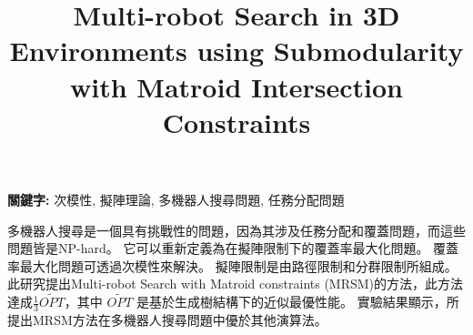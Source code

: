 \title{Multi-robot Search in 3D Environments using Submodularity with Matroid Intersection Constraints}
\begin{abstractcn}
%

{\bf \sf 關鍵字:} 次模性, 擬陣理論, 多機器人搜尋問題, 任務分配問題

\vspace{2em}

多機器人搜尋是一個具有挑戰性的問題，因為其涉及任務分配和覆蓋問題，而這些問題皆是NP-hard。
它可以重新定義為在擬陣限制下的覆蓋率最大化問題。
覆蓋率最大化問題可透過次模性來解決。
擬陣限制是由路徑限制和分群限制所組成。
此研究提出Multi-robot Search with Matroid constraints (MRSM)的方法，此方法達成$\frac{1}{3}\widetilde{OPT}$，其中 $\widetilde{OPT}$ 是基於生成樹結構下的近似最優性能。
實驗結果顯示，所提出MRSM方法在多機器人搜尋問題中優於其他演算法。
\end{abstractcn} 
